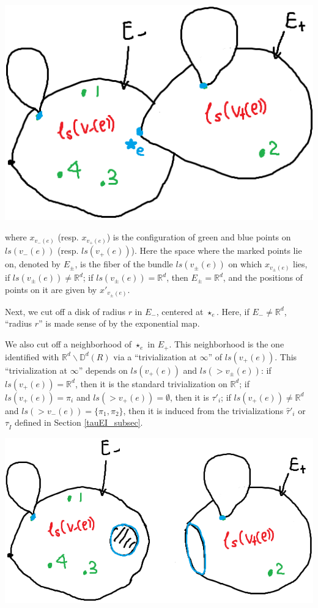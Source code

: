 \documentclass[11pt]{article}
\theoremstyle{definition}
\theoremstyle{remark}
\def\R{\mathbb{R}}
\def\D{\mathbb{D}}
\def\rI{{\mathring{I}}}
\begin{document}
\includegraphics[scale=0.5]{yedfn1_fig}

where $x_{v_-(e)}$ (resp. $x_{v_+(e)}$) is the configuration of green and blue points on $ls(v_-(e))$ (resp. $ls(v_+(e))$). 
Here the space where the marked points lie on, denoted by $E_\pm$, is the fiber of the bundle $ls(v_\pm(e))$ on which $x_{v_\pm(e)}$ lies, if $ls(v_\pm(e))\neq\R^d$; if $ls(v_{\pm}(e))=\R^d$, then $E_\pm=\R^d$, and the positions of points on it are given by $x'_{v_\pm(e)}$. 

Next, we cut off a disk of radius $r$ in $E_-$, centered at $\star_e$. Here, if $E_-\neq\R^d$, ``radius $r$'' is made sense of by the exponential map. 

We also cut off a neighborhood of $\star_e$ in $E_+$. This neighborhood is the one identified with $\R^d\backslash\D^d(R)$ via a ``trivialization at $\infty$'' of $ls(v_+(e))$. This ``trivialization at $\infty$'' depends on $ls(v_+(e))$ and $ls(>v_\pm(e))$: if $ls(v_+(e))=\R^d$, then it is the standard trivialization on $\R^d$; if $ls(v_+(e))=\pi_i$ and $ls(>v_+(e))=\emptyset$, then it is $\tau'_i$; if $ls(v_+(e))\neq\R^d$ and $ls(>v_-(e))=\{\pi_1,\pi_2\}$, then it is induced from the trivializations $\hat\tau'_i$ or $\tau_\rI$ defined in Section \ref{tauEI_subsec}. 

\includegraphics[scale=0.5]{yedfn2_fig}
\end{document}
